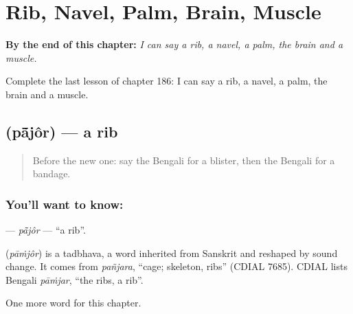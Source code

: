 
\chapter{Rib, Navel, Palm, Brain, Muscle}
\label{ch:bn-rib-navel-palm-brain-muscle}

\begin{chapteropening}
\textbf{By the end of this chapter:} \emph{I can say a rib, a navel, a palm, the brain and a muscle.}

Complete the last lesson of chapter 186: I can say a rib, a navel, a palm, the brain and a muscle.
\end{chapteropening}

\section[\texorpdfstring{\bn{পাঁজর} (pā̃jôr)}{পাঁজর (pā̃jôr)}]{ (pā̃jôr) — a rib}

\label{lesson:BN-C186-pajor}



\begin{quote}
Before the new one: say the Bengali for a blister, then the Bengali for a bandage.
\end{quote}

\subsection*{You'll want to know: }
\textbf{} — \emph{pā̃jôr} — \textquotedblleft{}a rib\textquotedblright{}.

\begin{cousinweb}
\textbf{} (\emph{pāṁjôr}) is a tadbhava, a word inherited from Sanskrit and reshaped by sound change. It comes from \emph{pañjara}, \textquotedblleft{}cage; skeleton, ribs\textquotedblright{} (CDIAL 7685). CDIAL lists Bengali \emph{pāṁjar}, \textquotedblleft{}the ribs, a rib\textquotedblright{}.
\end{cousinweb}

\begin{grammarlens}[title={What you've built}]
One more word for this chapter.
\end{grammarlens}

